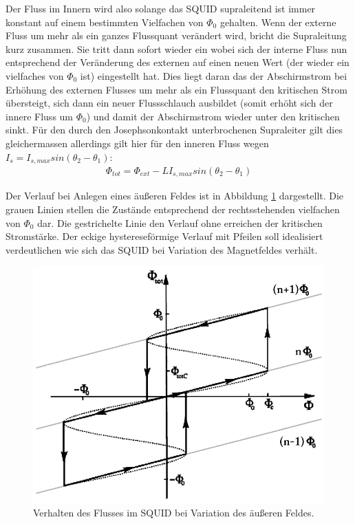 \documentclass[12pt]{article}
\begin{document}
Der Fluss im Innern wird also solange das SQUID supraleitend ist immer konstant auf einem bestimmten Vielfachen von $\Phi_0$ gehalten. Wenn der externe Fluss um mehr als ein ganzes Flussquant verändert wird, bricht die Supraleitung kurz zusammen. Sie tritt dann sofort wieder ein wobei sich der interne Fluss nun entsprechend der Veränderung des externen auf einen neuen Wert (der wieder ein vielfaches von  $\Phi_0$ ist) eingestellt hat. Dies liegt  daran das der Abschirmstrom bei Erhöhung des externen Flusses um mehr als ein Flussquant den kritischen Strom übersteigt, sich dann ein neuer Flussschlauch ausbildet (somit erhöht sich der innere Fluss um $\Phi_0$) und damit der Abschirmstrom wieder unter den kritischen sinkt.
Für den durch den Josephsonkontakt unterbrochenen Supraleiter gilt dies gleichermassen allerdings gilt hier für den inneren Fluss wegen $I_s=I_{s,max} sin(\theta_2-\theta_1)$:
\begin{align}
 \Phi_{tot}=\Phi_{ext}-L I_{s,max} sin(\theta_2-\theta_1)
\end{align}

Der Verlauf bei Anlegen eines äußeren Feldes ist in Abbildung \ref{verlauf} dargestellt. Die grauen Linien stellen die Zustände entsprechend der rechtsstehenden vielfachen von $\Phi_0$ dar. Die gestrichelte Linie den Verlauf ohne erreichen der kritischen Stromstärke. Der eckige hystereseförmige Verlauf mit Pfeilen soll idealisiert verdeutlichen wie sich das SQUID bei Variation des Magnetfeldes verhält. 
\begin{figure}[H]
\centering
\includegraphics[width=0.9\linewidth]{pictures/squid_feld_verlauf.eps}
\caption{Verhalten des Flusses im SQUID bei Variation des äußeren Feldes.}
\label{verlauf}
\end{figure}
\end{document}
